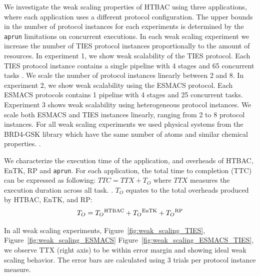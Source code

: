 We investigate the weak scaling properties of HTBAC using three applications,
where each application uses a different protocol configuration. The upper
bounds in the number of protocol instances for each experiments is determined
by the \texttt{aprun} limitations on concurrent executions. In each weak
scaling experiment we increase the number of TIES protocol instances
proportionally to the amount of resources. In experiment 1, we show weak
scalability of the TIES protocol. Each TIES protocol instance contains a
single pipeline with 4 stages and 65 concurrent tasks
 . We scale the number of protocol instances linearly
between 2 and 8. In experiment 2, we show weak scalability using the ESMACS
protocol. Each ESMACS protocols contains 1 pipeline with 4 stages and 25
concurrent tasks. Experiment 3 shows weak scalability using heterogeneous
protocol instances. We scale both ESMACS and TIES instances linearly, ranging
from 2 to 8 protocol instances. For all weak scaling experiments we used
physical systems from the BRD4-GSK library which have the same number of
atoms and similar chemical properties. .

We characterize the execution time of the application, and overheads of
HTBAC, EnTK, RP and \texttt{aprun}.  For each application, the total time to
completion (TTC)   can be expressed
as following: $TTC = TTX + T_{O}$ where \(TTX\) measures the execution
duration across all task.
. $T_{O}$ equates to the total overheads
produced by HTBAC, EnTK, and RP: $$T_{O} = T_{O}\textsuperscript{HTBAC} +
T_{O}\textsuperscript{EnTK} + T_{O}\textsuperscript{RP}$$ 


In all weak scaling experiments, Figure~\ref{fig:weak_scaling_TIES},
Figure~\ref{fig:weak_scaling_ESMACS}
Figure~\ref{fig:weak_scaling_ESMACS_TIES}, we observe TTX (right axis) to be
within error margin and showing ideal weak scaling behavior. The error bars
are calculated using 3 trials per protocol instance measure.

